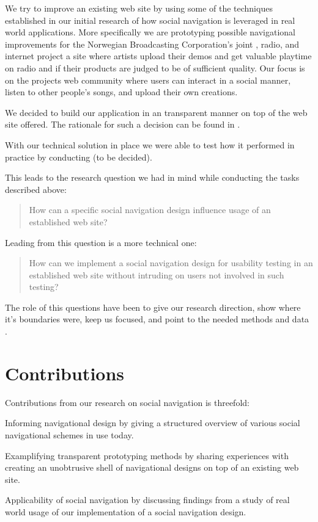 We try to improve an existing web site by using some of the techniques
established in our initial research of how social navigation is leveraged
in real world applications. More specifically we are prototyping possible
navigational improvements for the Norwegian Broadcasting Corporation's joint
, radio, and internet project \project{\urort{}}\dash{}a site where
artists upload their demos and get valuable playtime on radio and  if
their products are judged to be of sufficient quality. Our focus is on the
projects web community%
where users can interact in a social manner, listen to other people's songs,
and upload their own creations.

We decided to build our application in an transparent manner on top of the
web site \urort{} offered. The rationale for such a decision can be found in
.

With our technical solution in place we were able to test how it performed in
practice by conducting  (to be decided).

This leads to the research question we had in mind while conducting
the tasks described above:

\begin{quote}
  How can a specific social navigation design influence usage of
  an established web site?
\end{quote}

Leading from this question is a more technical one:

\begin{quote}
  How can we implement a social navigation design for
  usability testing in an established web site without
  intruding on users not involved in such testing?
\end{quote}

The role of this questions have been to give our research direction, show
where it's boundaries were, keep us focused, and point to the needed methods
and data \citep[p.~77]{silverman05}.


\section{Contributions}

Contributions from our research on social navigation is threefold:

\begin{enum}
  \item Informing navigational design by giving a structured overview of
    various social navigational schemes in use today.
  \item Examplifying transparent prototyping methods by sharing experiences
    with creating an unobtrusive shell of navigational designs on top of an
    existing web site.
  \item Applicability of social navigation by discussing findings from
    a study of real world usage of our implementation of a social navigation
    design.
\end{enum}

